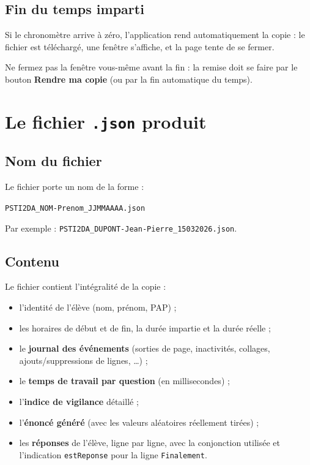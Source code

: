 \documentclass[11pt,a4paper]{article}
\begin{document}
\subsection{Fin du temps imparti}

Si le chronomètre arrive à zéro, l'application rend automatiquement la copie :
le fichier est téléchargé, une fenêtre s'affiche, et la page tente de se fermer.

\begin{attention}
Ne fermez pas la fenêtre vous-même avant la fin : la remise doit se faire par le
bouton \textbf{Rendre ma copie} (ou par la fin automatique du temps).
\end{attention}

\section{Le fichier \texttt{.json} produit}

\subsection{Nom du fichier}

Le fichier porte un nom de la forme :

\begin{center}
\verb|PSTI2DA_NOM-Prenom_JJMMAAAA.json|
\end{center}

Par exemple : \verb|PSTI2DA_DUPONT-Jean-Pierre_15032026.json|.

\subsection{Contenu}

Le fichier contient l'intégralité de la copie :
\begin{itemize}
  \item l'identité de l'élève (nom, prénom, PAP) ;
  \item les horaires de début et de fin, la durée impartie et la durée réelle ;
  \item le \textbf{journal des événements} (sorties de page, inactivités,
        collages, ajouts/suppressions de lignes, \dots) ;
  \item le \textbf{temps de travail par question} (en millisecondes) ;
  \item l'\textbf{indice de vigilance} détaillé ;
  \item l'\textbf{énoncé généré} (avec les valeurs aléatoires réellement
        tirées) ;
  \item les \textbf{réponses} de l'élève, ligne par ligne, avec la conjonction
        utilisée et l'indication \texttt{estReponse} pour la ligne
        \texttt{Finalement}.
\end{itemize}
\end{document}

